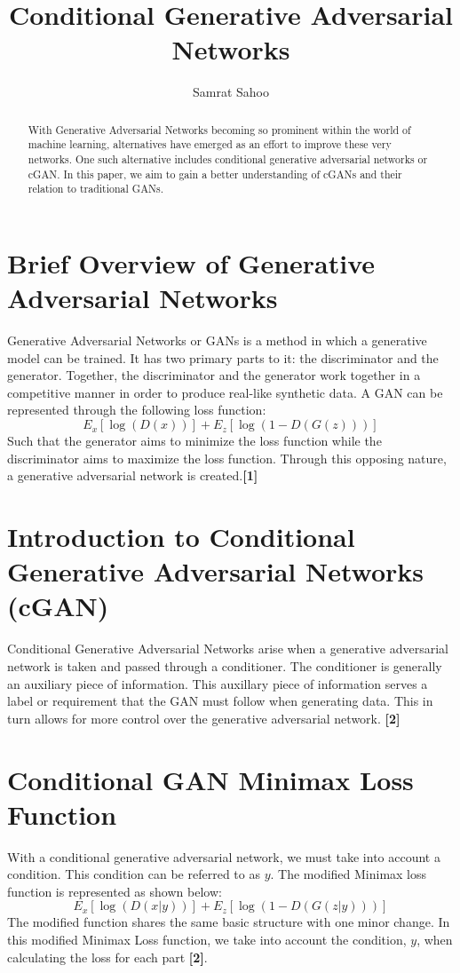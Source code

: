 \documentclass{cup-pan}
\title{Conditional Generative Adversarial Networks}
\author[ ]{Samrat Sahoo}
\affil[ ]{UT Arlington}
\affil[ ]{Advisor: Professor Won Hwa Kim}
\affil[ ]{Email: \url{won.kim@uta.edu}}
\begin{document}
\maketitle
 
\begin{abstract}
With Generative Adversarial Networks becoming so prominent within the world of machine learning, alternatives have emerged as an effort to improve these very networks. One such alternative includes conditional generative adversarial networks or cGAN. In this paper, we aim to gain a better understanding of cGANs and their relation to traditional GANs.

\end{abstract}

\section{Brief Overview of Generative Adversarial Networks}
\label{sec:overview}
Generative Adversarial Networks or GANs is a method in which a generative model can be trained. It has two primary parts to it: the discriminator and the generator. Together, the discriminator and the generator work together in a competitive manner in order to produce real-like synthetic data. A GAN can be represented through the following loss function:
\begin{equation}
E_x[\log (D(x))] + E_z[\log (1 - D(G(z)))] 
\end{equation}
Such that the generator aims to minimize the loss function while the discriminator aims to maximize the loss function. Through this opposing nature, a generative adversarial network is created.\textbf{[1]}

\section{Introduction to Conditional Generative Adversarial Networks (cGAN)}
Conditional Generative Adversarial Networks arise when a generative adversarial network is taken and passed through a conditioner. The conditioner is generally an auxiliary piece of information. This auxillary piece of information serves a label or requirement that the GAN must follow when generating data. This in turn allows for more control over the generative adversarial network. \textbf{[2]}

\section{Conditional GAN Minimax Loss Function}
With a conditional generative adversarial network, we must take into account a condition. This condition can be referred to as $y$. The modified Minimax loss function is represented as shown below:
\begin{equation}
E_x[\log (D(x|y))] + E_z[\log (1 - D(G(z|y)))] 
\end{equation}
The modified function shares the same basic structure with one minor change. In this modified Minimax Loss function, we take into account the condition, $y$, when calculating the loss for each part \textbf{[2]}.
\end{document}
